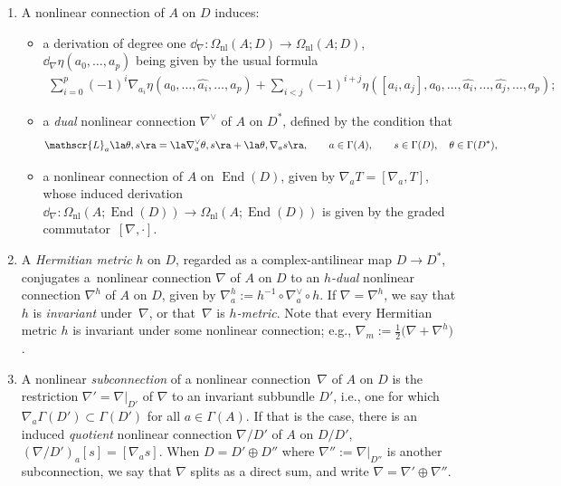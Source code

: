 \begin{enumerate}
\begin{enumerate}
\end{enumerate}
\item A nonlinear connection of $A$ on $D$ induces:
\begin{itemize}\itemsep=0pt
 \item a derivation of degree one $\dd_{\nabla}\colon \Omega_{\mathrm{nl}}(A;D) \to \Omega_{\mathrm{nl}}(A;D)$, $\dd_{\nabla}\eta(a_0,\dots ,a_p)$ being given by the usual formula
\begin{gather*}
 \!\sum_{i=0}^p\! (-1)^i\nabla_{a_i}\eta(a_0,\dots ,\widehat{a_i},\dots ,a_p) + \!\sum_{i<j}\! (-1)^{i+j}\eta([a_i,a_j],a_0,\dots ,\widehat{a_i},\dots ,\widehat{a_j},\dots ,a_p);\!
\end{gather*}
\item a \emph{dual} nonlinear connection $\nabla^{\vee}$ of $A$ on $D^*$, defined by the condition that
\begin{gather*}
 \mathscr{L}_a\la \theta,s\ra = \la \nabla^{\vee}_a\theta,s\ra + \la \theta,\nabla_as\ra, \qquad a \in \Gamma(A), \qquad s \in \Gamma(D), \quad \theta \in \Gamma(D^*),
\end{gather*}
\item a nonlinear connection of $A$ on $\operatorname{End}(D)$, given by $\nabla_aT=[\nabla_a,T]$, whose induced derivation $\dd_{\nabla}\colon\Omega_{\mathrm{nl}}(A;\operatorname{End}(D)) \to \Omega_{\mathrm{nl}}(A;\operatorname{End}(D))$ is given by the graded commuta\-tor~$[\nabla,\cdot]$.
\end{itemize}
\item A \emph{Hermitian metric} $h$ on $D$, regarded as a complex-antilinear map $D \to D^*$, conjugates a~nonlinear connection $\nabla$ of $A$ on $D$ to an \emph{$h$-dual} nonlinear connection $\nabla^h$ of $A$ on $D$, given by $\nabla^h_a:= h^{-1} \circ \nabla^{\vee}_a \circ h$. If $\nabla=\nabla^h$, we say that $h$ is \emph{invariant} under~$\nabla$, or that~$\nabla$ is \emph{$h$-metric}. Note that every Hermitian metric $h$ is invariant under some nonlinear connection; e.g., $\nabla_m:= \frac{1}{2}\big(\nabla+\nabla^h\big)$.
\item A nonlinear \emph{subconnection} of a nonlinear connection~$\nabla$ of $A$ on $D$ is the restriction $\nabla'=\nabla|_{D'}$ of $\nabla$ to an invariant subbundle $D'$, i.e., one for which $\nabla_a \Gamma(D') \subset \Gamma(D')$ for all $a \in \Gamma(A)$. If that is the case, there is an induced \emph{quotient} nonlinear connection $\nabla/D'$ of $A$ on $D/D'$, $(\nabla/D')_a [s] = [\nabla_as]$. When $D = D' \oplus D''$ where $\nabla'':=\nabla|_{D''}$ is another subconnection, we say that $\nabla$ splits as a direct sum, and write $\nabla = \nabla' \oplus \nabla''$.

\end{enumerate}
